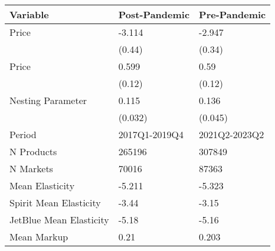 
\begin{tabular}[t]{lll}
\toprule
Variable & Post-Pandemic & Pre-Pandemic\\
\midrule
Price & -3.114 & -2.947\\
 & (0.44) & (0.34)\\
\midrule
Price & 0.599 & 0.59\\
 & (0.12) & (0.12)\\
\midrule
Nesting Parameter & 0.115 & 0.136\\
\addlinespace
 & (0.032) & (0.045)\\
\midrule
Period & 2017Q1-2019Q4 & 2021Q2-2023Q2\\
N Products & 265196 & 307849\\
N Markets & 70016 & 87363\\
Mean Elasticity & -5.211 & -5.323\\
\addlinespace
Spirit Mean Elasticity & -3.44 & -3.15\\
JetBlue Mean Elasticity & -5.18 & -5.16\\
Mean Markup & 0.21 & 0.203\\
\bottomrule
\end{tabular}
